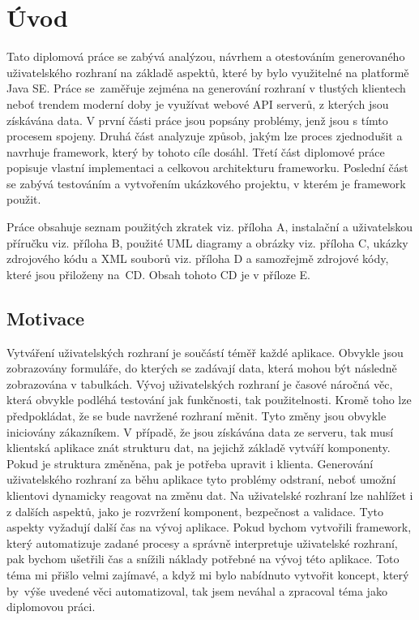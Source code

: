 \chapter{Úvod}
Tato diplomová práce se zabývá analýzou, návrhem a otestováním generovaného uživatelského rozhraní na základě aspektů, které by bylo využitelné na platformě Java SE. Práce se~zaměřuje zejména na generování rozhraní v tlustých klientech neboť trendem moderní doby je využívat webové API serverů, z kterých jsou získávána data. V první části práce jsou popsány problémy, jenž jsou s tímto procesem spojeny. Druhá část analyzuje způsob, jakým lze proces zjednodušit a navrhuje framework, který by tohoto cíle dosáhl. Třetí část diplomové práce popisuje vlastní implementaci a celkovou architekturu frameworku. Poslední část se zabývá testováním a vytvořením ukázkového projektu, v kterém je framework použit.

Práce obsahuje seznam použitých zkratek viz. příloha A, instalační a uživatelskou příručku viz. příloha B, použité UML diagramy a obrázky viz. příloha C, ukázky zdrojového kódu a XML souborů viz. příloha D a samozřejmě zdrojové kódy, které jsou přiloženy na~CD. Obsah tohoto CD je v příloze E.
\section{Motivace}
Vytváření uživatelských rozhraní je součástí téměř každé aplikace. Obvykle jsou zobrazovány formuláře, do kterých se zadávají data, která mohou být následně zobrazována v tabulkách. Vývoj uživatelských rozhraní je časové náročná věc, která obvykle podléhá testování jak funkčnosti, tak použitelnosti. Kromě toho lze předpokládat, že se bude navržené rozhraní měnit. Tyto změny jsou obvykle iniciovány zákazníkem. V případě, že jsou získávána data ze serveru, tak musí klientská aplikace znát strukturu dat, na jejichž základě vytváří komponenty. Pokud je struktura změněna, pak je potřeba upravit i klienta. Generování uživatelského rozhraní za běhu aplikace tyto problémy odstraní, neboť umožní klientovi dynamicky reagovat na změnu dat. Na uživatelské rozhraní lze nahlížet i z dalších aspektů, jako je rozvržení komponent, bezpečnost a validace. Tyto aspekty vyžadují další čas na vývoj aplikace. Pokud bychom vytvořili framework, který automatizuje zadané procesy a správně interpretuje uživatelské rozhraní, pak bychom ušetřili čas a snížili náklady potřebné na vývoj této aplikace. Toto téma mi přišlo velmi zajímavé, a když mi bylo nabídnuto vytvořit koncept, který by~výše uvedené věci automatizoval, tak jsem neváhal a zpracoval téma jako diplomovou práci.